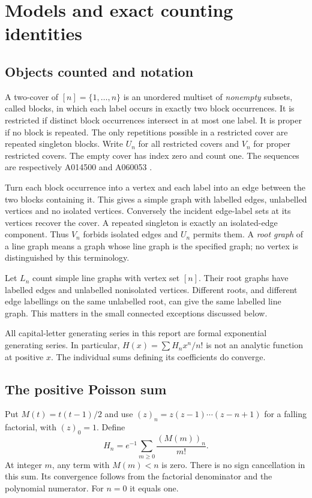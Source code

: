 \section{Models and exact counting identities}
\subsection{Objects counted and notation}
A two-cover of $[n]=\{1,\ldots,n\}$ is an unordered multiset of \emph{nonempty} subsets, called blocks, in which each label occurs in exactly two block occurrences. It is restricted if distinct block occurrences intersect in at most one label. It is proper if no block is repeated. The only repetitions possible in a restricted cover are repeated singleton blocks. Write $U_n$ for all restricted covers and $V_n$ for proper restricted covers. The empty cover has index zero and count one. The sequences are respectively A014500 and A060053 \cite{oeisU,oeisV}.

Turn each block occurrence into a vertex and each label into an edge between the two blocks containing it. This gives a simple graph with labelled edges, unlabelled vertices and no isolated vertices. Conversely the incident edge-label sets at its vertices recover the cover. A repeated singleton is exactly an isolated-edge component. Thus $V_n$ forbids isolated edges and $U_n$ permits them. A \emph{root graph} of a line graph means a graph whose line graph is the specified graph; no vertex is distinguished by this terminology.

Let $L_n$ count simple line graphs with vertex set $[n]$. Their root graphs have labelled edges and unlabelled nonisolated vertices. Different roots, and different edge labellings on the same unlabelled root, can give the same labelled line graph. This matters in the small connected exceptions discussed below.

All capital-letter generating series in this report are formal exponential generating series. In particular, $H(x)=\sum H_nx^n/n!$ is not an analytic function at positive $x$. The individual sums defining its coefficients do converge.

\subsection{The positive Poisson sum}
Put $M(t)=t(t-1)/2$ and use $(z)_n=z(z-1)\cdots(z-n+1)$ for a falling factorial, with $(z)_0=1$. Define
\begin{equation}\label{tcl:eq:poisson}
H_n=e^{-1}\sum_{m\ge0}\frac{(M(m))_n}{m!}.
\end{equation}
At integer $m$, any term with $M(m)<n$ is zero. There is no sign cancellation in this sum. Its convergence follows from the factorial denominator and the polynomial numerator. For $n=0$ it equals one.

